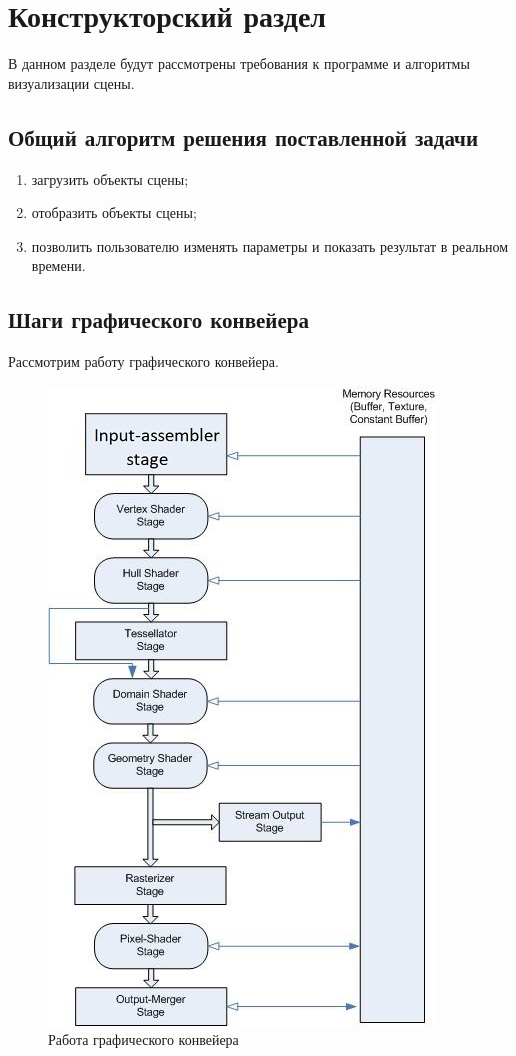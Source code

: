 \chapter{Конструкторский раздел}
В данном разделе будут рассмотрены требования к программе и алгоритмы визуализации сцены.

\section{Общий алгоритм решения поставленной задачи}
\begin{enumerate}
	\item загрузить объекты сцены;
    \item отобразить объекты сцены;
	\item позволить пользователю изменять параметры и показать результат в реальном времени.
\end{enumerate}


\section{Шаги графического конвейера}

Рассмотрим работу графического конвейера.

\begin{figure}[H]
	\begin{center}
		\includegraphics[scale=0.88]{img/conveer.jpg}
	\end{center}
	\captionsetup{justification=centering}
	\caption{Работа графического конвейера}
	\label{img:konv}
\end{figure}

